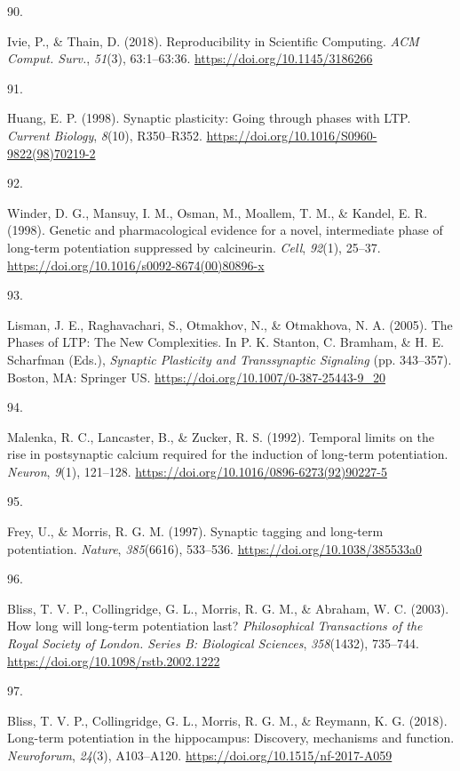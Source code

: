 \documentclass[
  11pt,
  letterpaper,
]{scrreprt}
\newlength{\cslhangindent}
\newlength{\csllabelwidth}
\newenvironment{CSLReferences}[2] %
 {\begin{list}{}{%
  \setlength{\itemindent}{0pt}
  \setlength{\leftmargin}{0pt}
  \setlength{\parsep}{0pt}
  \ifodd #1
   \setlength{\leftmargin}{\cslhangindent}
   \setlength{\itemindent}{-1\cslhangindent}
  \fi
  \setlength{\itemsep}{#2\baselineskip}}}
 {\end{list}}
\newcommand{\CSLLeftMargin}[1]{\parbox[t]{\csllabelwidth}{\strut#1\strut}}
\newcommand{\CSLRightInline}[1]{\parbox[t]{\linewidth - \csllabelwidth}{\strut#1\strut}}
\begin{document}
\begin{CSLReferences}{0}{0}
\CSLLeftMargin{90. }%
\CSLRightInline{Ivie, P., \& Thain, D. (2018). Reproducibility in
{Scientific Computing}. \emph{ACM Comput. Surv.}, \emph{51}(3),
63:1--63:36. \url{https://doi.org/10.1145/3186266}}

\CSLLeftMargin{91. }%
\CSLRightInline{Huang, E. P. (1998). Synaptic plasticity: {Going}
through phases with {LTP}. \emph{Current Biology}, \emph{8}(10),
R350--R352. \url{https://doi.org/10.1016/S0960-9822(98)70219-2}}

\CSLLeftMargin{92. }%
\CSLRightInline{Winder, D. G., Mansuy, I. M., Osman, M., Moallem, T. M.,
\& Kandel, E. R. (1998). Genetic and pharmacological evidence for a
novel, intermediate phase of long-term potentiation suppressed by
calcineurin. \emph{Cell}, \emph{92}(1), 25--37.
\url{https://doi.org/10.1016/s0092-8674(00)80896-x}}

\CSLLeftMargin{93. }%
\CSLRightInline{Lisman, J. E., Raghavachari, S., Otmakhov, N., \&
Otmakhova, N. A. (2005). The {Phases} of {LTP}: {The New Complexities}.
In P. K. Stanton, C. Bramham, \& H. E. Scharfman (Eds.), \emph{Synaptic
{Plasticity} and {Transsynaptic Signaling}} (pp. 343--357). Boston, MA:
Springer US. \url{https://doi.org/10.1007/0-387-25443-9_20}}

\CSLLeftMargin{94. }%
\CSLRightInline{Malenka, R. C., Lancaster, B., \& Zucker, R. S. (1992).
Temporal limits on the rise in postsynaptic calcium required for the
induction of long-term potentiation. \emph{Neuron}, \emph{9}(1),
121--128. \url{https://doi.org/10.1016/0896-6273(92)90227-5}}

\CSLLeftMargin{95. }%
\CSLRightInline{Frey, U., \& Morris, R. G. M. (1997). Synaptic tagging
and long-term potentiation. \emph{Nature}, \emph{385}(6616), 533--536.
\url{https://doi.org/10.1038/385533a0}}

\CSLLeftMargin{96. }%
\CSLRightInline{Bliss, T. V. P., Collingridge, G. L., Morris, R. G. M.,
\& Abraham, W. C. (2003). How long will long-term potentiation last?
\emph{Philosophical Transactions of the Royal Society of London. Series
B: Biological Sciences}, \emph{358}(1432), 735--744.
\url{https://doi.org/10.1098/rstb.2002.1222}}

\CSLLeftMargin{97. }%
\CSLRightInline{Bliss, T. V. P., Collingridge, G. L., Morris, R. G. M.,
\& Reymann, K. G. (2018). Long-term potentiation in the hippocampus:
Discovery, mechanisms and function. \emph{Neuroforum}, \emph{24}(3),
A103--A120. \url{https://doi.org/10.1515/nf-2017-A059}}


\end{CSLReferences}
\end{document}
